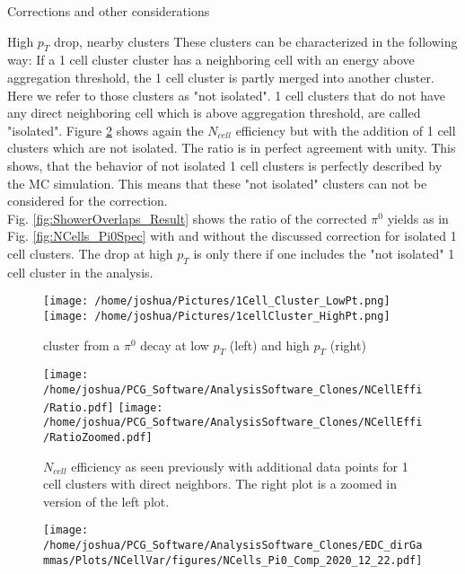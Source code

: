 \documentclass[ALICE]{ALICE_analysis_notes}
\begin{document}
\begin{section}{Corrections and other considerations}
\begin{subsection}{High $p_{T}$ drop, nearby clusters}
These clusters can be characterized in the following way: If a 1 cell cluster cluster has a neighboring cell with an energy above aggregation threshold, the 1 cell cluster is partly merged into another cluster. Here we refer to those clusters as "not isolated". 1 cell clusters that do not have any direct neighboring cell which is above aggregation threshold, are called "isolated".
Figure \ref{fig:ShowerOverlapsEffi} shows again the $N_{cell}$ efficiency but with the addition of 1 cell clusters which are not isolated. The ratio is in perfect agreement with unity. This shows, that the behavior of not isolated 1 cell clusters is perfectly described by the MC simulation. This means that these "not isolated" clusters can not be considered for the correction. \\
Fig. \ref{fig:ShowerOverlaps_Result} shows the ratio of the corrected $\pi^{0}$ yields as in Fig. \ref{fig:NCells_Pi0Spec} with and without the discussed correction for isolated 1 cell clusters. The drop at high $p_{T}$ is only there if one includes the "not isolated" 1 cell cluster in the analysis. 

\begin{figure}[ht!]
	\centering
	\texttt{[image: /home/joshua/Pictures/1Cell\_Cluster\_LowPt.png]}
	\texttt{[image: /home/joshua/Pictures/1cellCluster\_HighPt.png]}
	
	\caption{ cluster from a $\pi^{0}$ decay at low $p_{T}$ (left) and high $p_{T}$ (right)}
	\label{fig:ShowerOverlaps}
\end{figure}



\begin{figure}[ht!]
	\centering
	\texttt{[image: /home/joshua/PCG\_Software/AnalysisSoftware\_Clones/NCellEffi/Ratio.pdf]}
	\texttt{[image: /home/joshua/PCG\_Software/AnalysisSoftware\_Clones/NCellEffi/RatioZoomed.pdf]}
	
	\caption{ $N_{cell}$ efficiency as seen previously with additional data points for 1 cell clusters with direct neighbors. The right plot is a zoomed in version of the left plot.}
	\label{fig:ShowerOverlapsEffi}
\end{figure}

\begin{figure}[ht!]
	\centering
	\texttt{[image: /home/joshua/PCG\_Software/AnalysisSoftware\_Clones/EDC\_dirGammas/Plots/NCellVar/figures/NCells\_Pi0\_Comp\_2020\_12\_22.pdf]}
	

\end{figure}
\end{subsection}
\end{section}
\end{document}

